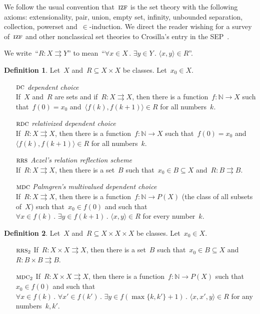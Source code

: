 \documentclass[oneside,reqno]{amsart}
\theoremstyle{definition}
\newtheorem{defn}{Definition}[section]
\theoremstyle{plain}
\theoremstyle{remark}
\newcommand{\NN}{\mathbb{N}}
\renewcommand{\_}{\mathpunct{.}\,}
\newcommand{\?}{\,{:}\,}
\newcommand{\IZF}{\textsc{izf}}
\newcommand{\RRS}{\textsc{rrs}}
\newcommand{\RDC}{\textsc{rdc}}
\newcommand{\DC}{\textsc{dc}}
\newcommand{\MDC}{\textsc{mdc}}
\begin{document}
We follow the usual convention that~$\IZF$ is the set theory with the following
axioms: extensionality, pair, union, empty set, infinity, unbounded separation,
collection, powerset and~$\in$-induction. We direct the reader wishing for a
survey of~$\IZF$ and other nonclassical set theories to Crosilla's entry in the
SEP~\cite{crosilla:cst-izf}.

We write~``$R : X \rightrightarrows Y$'' to mean~``$\forall x \in X\_ \exists y
\in Y\_ \langle x,y \rangle \in R$''.

\begin{defn}Let~$X$ and~$R \subseteq X \times X$ be classes. Let~$x_0 \in X$.
\begin{itemize}
\setlength{\itemsep}{0.3em}
\item[$\DC$] \emph{dependent choice} \\ If~$X$ and~$R$ are sets and
if~$R : X \rightrightarrows X$, then there is a function~$f : \NN \to X$ such that~$f(0) =
x_0$ and~$\langle f(k), f(k+1) \rangle \in R$ for all numbers~$k$.
\item[$\RDC$] \emph{relativized dependent choice} \\ If~$R : X
\rightrightarrows X$, then there is a function~$f : \NN \to X$ such that~$f(0)
= x_0$ and~$\langle f(k), f(k+1) \rangle \in R$ for all numbers~$k$.
\item[$\RRS$] \emph{Aczel's relation reflection scheme} \\
If~$R : X \rightrightarrows X$, then there is
a set~$B$ such that~$x_0 \in B \subseteq X$ and~$R : B \rightrightarrows B$.
\item[$\MDC$] \emph{Palmgren's multivalued dependent choice} \\
If~$R : X \rightrightarrows X$, then there is a function~$f : \NN \to P(X)$
(the class of all subsets of~$X$) such that~$x_0 \in f(0)$ and such
that~$\forall x \in f(k)\_ \exists y \in f(k+1)\_ \langle x,y \rangle \in R$
for every number~$k$.
\end{itemize}
\end{defn}

\begin{defn}\label{defn:rrs2}
Let~$X$ and~$R \subseteq X \times X \times X$ be classes. Let~$x_0 \in X$.
\begin{itemize}
\setlength{\itemsep}{0.3em}
\item[$\RRS_2$]
If~$R : X \times X \rightrightarrows X$, then there is a set~$B$ such that~$x_0
\in B \subseteq X$ and~$R : B \times B \rightrightarrows B$.
\item[$\MDC_2$]
If~$R : X \times X \rightrightarrows X$, then there is a function~$f : \NN \to
P(X)$ such that~$x_0 \in f(0)$ and such that~$\forall x \in f(k)\_ \forall x'
\in f(k')\_ \exists y \in f(\max\{k,k'\}+1)\_ \langle x,x',y \rangle \in R$ for
any numbers~$k, k'$.
\end{itemize}
\end{defn}
\end{document}
